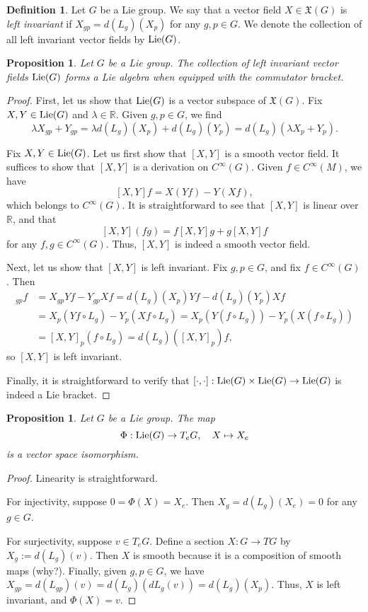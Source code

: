 \documentclass{amsart}[]
\newcommand{\R}{\mathbb R}
\newcommand{\why}{\color{red}(why?)\color{black}}
\newcommand{\lie}{\text{\normalfont Lie}}
\theoremstyle{plain}
\newtheorem{proposition}[theorem]{Proposition}
\theoremstyle{definition}
\newtheorem{definition}[theorem]{Definition}
\theoremstyle{remark}
\begin{document}
	\begin{definition}
		Let $G$ be a Lie group. We say that a vector field $X \in \mathfrak X(G)$ is \emph{left invariant} if $X_{g p} = d(L_g)(X_p)$ for any $g,p \in G$. We denote the collection of all left invariant vector fields by $\lie(G)$.
	\end{definition}

	\begin{proposition}
		Let $G$ be a Lie group. The collection of left invariant vector fields $\lie(G)$ forms a Lie algebra when equipped with the commutator bracket.
	\end{proposition}
	\begin{proof}
		First, let us show that $\lie(G)$ is a vector subspace of $\mathfrak X(G)$. Fix $X,Y \in \lie(G)$ and $\lambda \in \R$. Given $g,p \in G$, we find 
		$$\lambda X_{gp} + Y_{gp} = \lambda d(L_g)(X_p) + d(L_g)(Y_p) = d(L_g)(\lambda X_p + Y_p).$$
		
		Fix $X,Y \in \lie(G)$. Let us first show that $[X,Y]$ is a smooth vector field. It suffices to show that $[X,Y]$ is a derivation on $C^\infty(G)$. Given $f \in C^\infty(M)$, we have 
		$$[X,Y] f = X(Yf) - Y(Xf),$$
		which belongs to $C^\infty(G)$. It is straightforward to see that $[X,Y]$ is linear over $\R$, and that 
		$$[X,Y](fg) = f[X,Y]g + g[X,Y]f$$
		for any $f,g \in C^\infty(G)$. Thus, $[X,Y]$ is indeed a smooth vector field.
		
		Next, let us show that $[X,Y]$ is left invariant. Fix $g, p \in G$, and fix $f \in C^\infty(G)$. Then 
		\begin{align*}
			[X,Y]_{gp} f &= X_{gp} Yf - Y_{gp} Xf = d(L_g)(X_p) Yf - d(L_g)(Y_p) Xf \\
			&= X_p(Yf \circ L_g) - Y_p(Xf \circ L_g) = X_p(Y(f \circ L_g)) - Y_p (X(f \circ L_g)) \\
			&= [X,Y]_p(f \circ L_g) = d(L_g)([X,Y]_p)f,
		\end{align*}
		so $[X,Y]$ is left invariant.
		
		Finally, it is straightforward to verify that 
		$[\cdot,\cdot]:\lie(G) \times \lie(G) \rightarrow \lie(G)$
		is indeed a Lie bracket.
	\end{proof}
	
	\begin{proposition}
		Let $G$ be a Lie group. The map $$\Phi: \lie(G) \rightarrow T_e G, \quad X \mapsto X_e$$ is a vector space isomorphism.
	\end{proposition}
	\begin{proof}
		Linearity is straightforward.
		
		For injectivity, suppose $0 = \Phi(X) = X_e$. Then $X_g = d(L_g)(X_e) = 0$ for any $g \in G$.
		
		For surjectivity, suppose $v \in T_e G$. Define a section $X:G \rightarrow TG$ by
		$X_g := d(L_g)(v).$
		Then $X$ is smooth because it is a composition of smooth maps \why. Finally, given $g,p \in G$, we have 
		$X_{gp} = d(L_{gp})(v) = d(L_g)(dL_g(v)) = d(L_g)(X_p).$
		Thus, $X$ is left invariant, and $\Phi(X) =v$.
	\end{proof}
\end{document}
